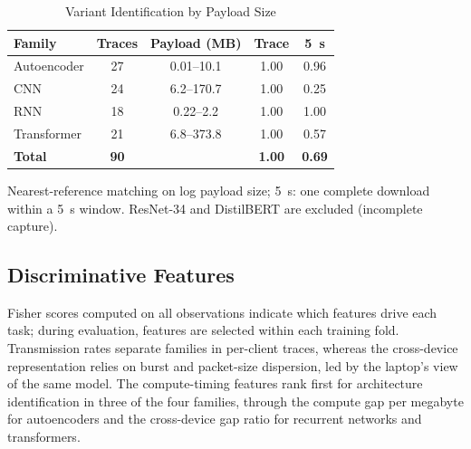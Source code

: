\begin{table}[!htbp]
\centering
\caption{Variant Identification by Payload Size}
\label{tab:variant_results}
\scriptsize
\renewcommand{\arraystretch}{1.05}
\setlength{\tabcolsep}{3pt}
\begin{tabular}{lcccc}
\hline
\textbf{Family} & \textbf{Traces} & \textbf{Payload (MB)} & \textbf{Trace} & \textbf{5~s} \\
\hline
Autoencoder & 27 & 0.01--10.1  & 1.00 & 0.96 \\
CNN         & 24 & 6.2--170.7  & 1.00 & 0.25 \\
RNN         & 18 & 0.22--2.2   & 1.00 & 1.00 \\
Transformer & 21 & 6.8--373.8  & 1.00 & 0.57 \\
\hline
\textbf{Total} & \textbf{90} & & \textbf{1.00} & \textbf{0.69} \\
\hline
\end{tabular}

\vspace{2pt}
\parbox{0.95\columnwidth}{\scriptsize Nearest-reference matching on log payload
size; 5~s: one complete download within a 5~s window. ResNet-34 and DistilBERT
are excluded (incomplete capture).}
\end{table}

\subsection{Discriminative Features}
\label{subsec:features}
Fisher scores computed on all observations indicate which features drive each
task; during evaluation, features are selected within each training fold. Transmission rates separate
families in per-client traces, whereas the cross-device representation relies on
burst and packet-size dispersion, led by the laptop's view of the same model.
The compute-timing features rank first for architecture identification in three
of the four families, through the compute gap per megabyte for autoencoders and
the cross-device gap ratio for recurrent networks and transformers.


